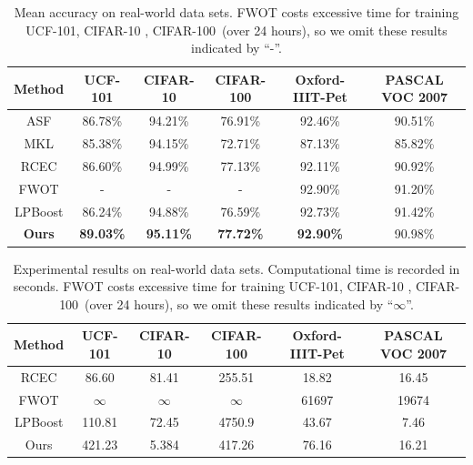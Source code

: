 \documentclass[10pt,twocolumn,letterpaper]{article}
\begin{document}
\begin{table}[t]
\centering
\begin{tabular}{c|c|c|c|c|c}
\hline
Method              & UCF-101          & CIFAR-10         & CIFAR-100        & Oxford-IIIT-Pet & PASCAL VOC 2007    \\\hline
ASF                 & 86.78\%          & 94.21\%          & 76.91\%          & 92.46\%         &   90.51\%          \\
MKL                 & 85.38\%          & 94.15\%          & 72.71\%          & 87.13\%         &   85.82\%          \\
RCEC                & 86.60\%          & 94.99\%          & 77.13\%          & 92.11\%         &   90.92\%          \\
FWOT                & -                & -                & -                & 92.90\%         &   91.20\%          \\
LPBoost             & 86.24\%          & 94.88\%          & 76.59\%          & 92.73\%         &   91.42\%          \\\hline
\textbf{Ours}       & \textbf{89.03\%} & \textbf{95.11\%} & \textbf{77.72\%} & \textbf{92.90\%}&   90.98\%          \\
\hline
\end{tabular}
\caption{Mean accuracy on real-world data sets.
FWOT costs excessive time for training UCF-101, CIFAR-10 , CIFAR-100~(over 24 hours),
so we omit these results indicated by ``-''.
}
\label{table:total_acc}
\end{table}


\begin{table}[t]
\centering
\begin{tabular}{c|c|c|c|c|c}
\hline
Method              & UCF-101    & CIFAR-10  & CIFAR-100  & Oxford-IIIT-Pet & PASCAL VOC 2007 \\\hline
RCEC                & 86.60      & 81.41     &  255.51    & 18.82           &   16.45         \\
FWOT                & $\infty$   & $\infty$  &  $\infty$  & 61697           &   19674         \\
LPBoost             & 110.81     & 72.45     &  4750.9    & 43.67           &   7.46          \\\hline
Ours                & 421.23     & 5.384     &  417.26    & 76.16           &   16.21         \\
\hline
\end{tabular}
\caption{Experimental results on real-world data sets. Computational time is recorded in seconds.
FWOT costs excessive time for training UCF-101, CIFAR-10 , CIFAR-100~(over 24 hours),
so we omit these results indicated by ``$\infty$''.}
\label{table:total_time}
\end{table}
\end{document}
